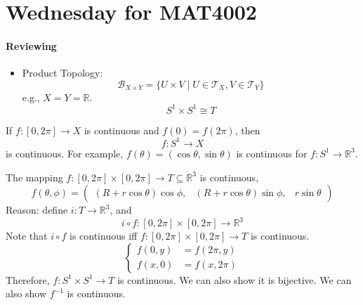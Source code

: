 \section{Wednesday for MAT4002}
\paragraph{Reviewing}
\begin{itemize}
\item
Product Topology:
\[
\mathcal{B}_{X\times Y}=\{U\times V\mid U\in\mathcal{T}_X,V\in\mathcal{T}_Y\}
\]
e.g., $X=Y=\mathbb{R}$.
\[
S^1\times S^1\cong T
\]
\end{itemize}
\begin{proposition}
If $f:[0,2\pi]\to X$ is continuous and $f(0)=f(2\pi)$, then
\[
f:S^1\to X
\]
is continuous. For example, $f(\theta)=(\cos\theta,\sin\theta)$ is continuous for $f:S^1\to\mathbb{R}^3$.
\end{proposition}

The mapping $f:[0,2\pi]\times[0,2\pi]\to T\subseteq\mathbb{R}^3$ is continuous,
\[
f(\theta,\phi)=\begin{pmatrix}
(R+r\cos\theta)\cos\phi,
&
(R+r\cos\theta)\sin\phi,
&
r\sin\theta
\end{pmatrix}
\]
Reason: define $i:T\to\mathbb{R}^3$, and
\[
i\circ f:[0,2\pi]\times[0,2\pi]\to\mathbb{R}^3
\]
Note that $i\circ f$ is continuous iff $f:[0,2\pi]\times[0,2\pi]\to T$ is continuous.
\[
\left\{
\begin{aligned}
f(0,y)&=f(2\pi,y)\\
f(x,0)&=f(x,2\pi)
\end{aligned}
\right.
\]
Therefore, $f:S^1\times S^1\to T$ is continuous. We can also show it is bijective. We can also show $f^{-1}$ is continuous.

